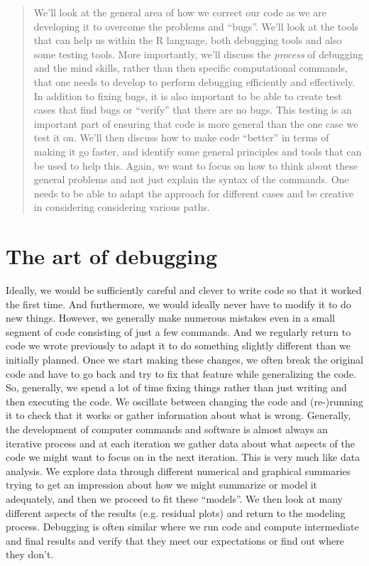 
\begin{abstract}
  We'll look at the general area of how we correct our code as we are
  developing it to overcome the problems and ``bugs''.
  We'll look at the tools that can help us within the R language, both
  debugging tools and also some testing tools.
  More importantly, we'll discuss the \textit{process} of debugging and the
  mind skills, rather than then specific computational commands, that
  one needs to develop to perform debugging efficiently and
  effectively.  In addition to fixing bugs, it is also important to be
  able to create test cases that find bugs or ``verify'' that there
  are no bugs. This testing is an important part of ensuring that 
  code is more general  than the one case we test it on.
  We'll then discuss how to make code ``better'' in terms of making it
  go faster, and identify some general principles and tools that can
  be used to help this. Again, we want to focus on how to think about
  these general problems and not just explain the syntax of the
  commands. One needs to be able to adapt the approach for different
  cases and be creative in considering considering various paths.

\end{abstract}


\section{The art of debugging}\label{sec:artOfDebugging}
Ideally, we would be sufficiently careful and clever to write code so
that it worked the first time.  And furthermore, we would ideally
never have to modify it to do new things.  However, we generally make
numerous mistakes even in a small segment of code consisting of just a
few commands.  And we regularly return to code we wrote previously to
adapt it to do something slightly different than we initially
planned. Once we start making these changes, we often break the
original code and have to go back and try to fix that feature while
generalizing the code.  So, generally, we spend a lot of time fixing
things rather than just writing and then executing the code. We
oscillate between changing the code and (re-)running it to check that it
works or gather information about what is wrong.  Generally, the
development of computer commands and software is almost always an
iterative process and at each iteration we gather data about what
aspects of the code we might want to focus on in the next iteration.
This is very much like data analysis.  We explore data through
different numerical and graphical summaries trying to get an
impression about how we might summarize or model it adequately, and
then we proceed to fit these ``models''.  We then look at many
different aspects of the results (e.g. residual plots) and return to
the modeling process.  Debugging is often similar where we run code
and compute intermediate and final results and verify that they meet
our expectations or find out where they don't.

